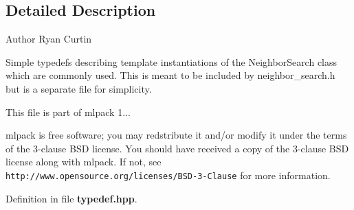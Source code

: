 \subsection{Detailed Description}
\begin{DoxyAuthor}{Author}
Ryan Curtin
\end{DoxyAuthor}
Simple typedefs describing template instantiations of the Neighbor\-Search class which are commonly used. This is meant to be included by neighbor\-\_\-search.\-h but is a separate file for simplicity.

This file is part of mlpack 1...

mlpack is free software; you may redstribute it and/or modify it under the terms of the 3-\/clause B\-S\-D license. You should have received a copy of the 3-\/clause B\-S\-D license along with mlpack. If not, see {\tt http\-://www.\-opensource.\-org/licenses/\-B\-S\-D-\/3-\/\-Clause} for more information. 

Definition in file {\bf typedef.\-hpp}.

